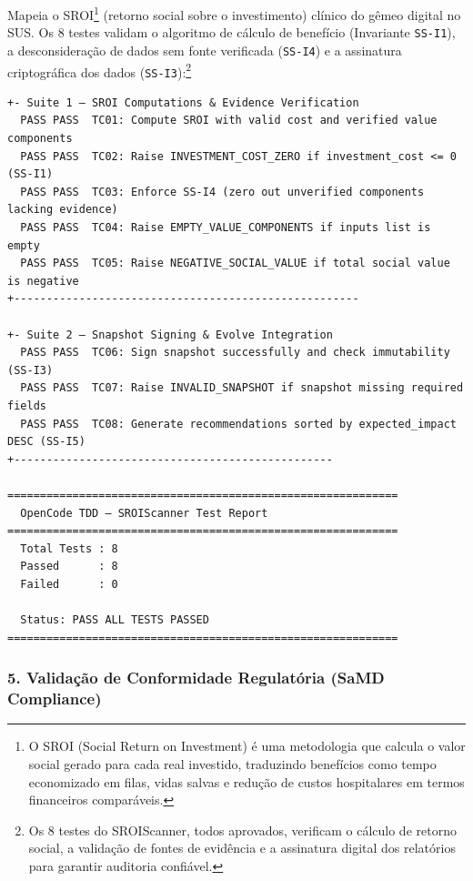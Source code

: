 Mapeia o SROI\footnote{O SROI (Social Return on Investment) é uma metodologia que calcula o valor social gerado para cada real investido, traduzindo benefícios como tempo economizado em filas, vidas salvas e redução de custos hospitalares em termos financeiros comparáveis.} (retorno social sobre o investimento) clínico do gêmeo digital no SUS. Os 8 testes validam o algoritmo de cálculo de benefício (Invariante \texttt{SS-I1}), a desconsideração de dados sem fonte verificada (\texttt{SS-I4}) e a assinatura criptográfica dos dados (\texttt{SS-I3}):\footnote{Os 8 testes do SROIScanner, todos aprovados, verificam o cálculo de retorno social, a validação de fontes de evidência e a assinatura digital dos relatórios para garantir auditoria confiável.}

\begin{lstlisting}[style=bashstyle, caption={Saída do Executor de Testes do OpenCode SROIScanner}, label={lst:tdd_ss_output}]
+- Suite 1 — SROI Computations & Evidence Verification
  PASS PASS  TC01: Compute SROI with valid cost and verified value components
  PASS PASS  TC02: Raise INVESTMENT_COST_ZERO if investment_cost <= 0 (SS-I1)
  PASS PASS  TC03: Enforce SS-I4 (zero out unverified components lacking evidence)
  PASS PASS  TC04: Raise EMPTY_VALUE_COMPONENTS if inputs list is empty
  PASS PASS  TC05: Raise NEGATIVE_SOCIAL_VALUE if total social value is negative
+-----------------------------------------------------

+- Suite 2 — Snapshot Signing & Evolve Integration
  PASS PASS  TC06: Sign snapshot successfully and check immutability (SS-I3)
  PASS PASS  TC07: Raise INVALID_SNAPSHOT if snapshot missing required fields
  PASS PASS  TC08: Generate recommendations sorted by expected_impact DESC (SS-I5)
+-------------------------------------------------

============================================================
  OpenCode TDD — SROIScanner Test Report
============================================================
  Total Tests : 8
  Passed      : 8
  Failed      : 0

  Status: PASS ALL TESTS PASSED
============================================================
\end{lstlisting}

\subsubsection*{5. Validação de Conformidade Regulatória (SaMD Compliance)}

